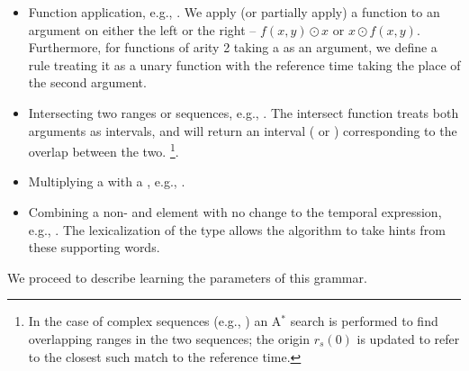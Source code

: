 \begin{itemize}
	\item Function application, e.g., .
		We apply (or partially apply) a function to an argument
			on either the left or the right -- $f(x,y) \odot x$ or $x \odot f(x,y)$.
		Furthermore, for functions of arity 2 taking a  as an argument,
			we define a rule treating it as a unary function with the reference time
			taking the place of the second argument.
	\item Intersecting two ranges or sequences, e.g., .
		The intersect function treats both arguments as intervals, and will return
			an interval ( or ) corresponding to the overlap
			between the two.
			\footnote{
				In the case of complex sequences 
					(e.g., ) an A$^{*}$
					search is performed to find overlapping ranges in the two sequences;
					the origin $r_s(0)$ is updated to refer to the closest such
					match to the reference time.
		}.
	\item Multiplying a  with a , e.g., .
	\item Combining a non- and  element with no change to the
			temporal expression, e.g., .
		The lexicalization of the  type allows the algorithm
			to take hints from these supporting words.
\end{itemize}

We proceed to describe learning the parameters of this grammar.

